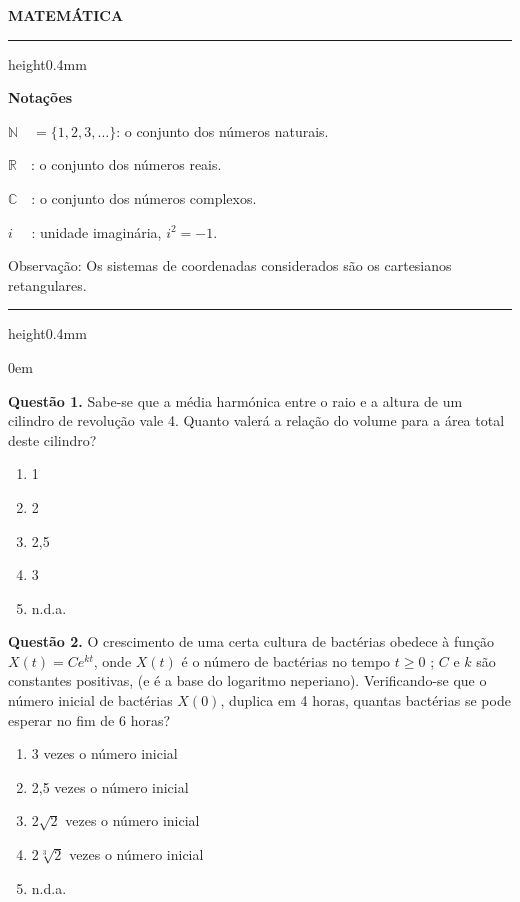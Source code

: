 \documentclass[11pt]{article}
\newcommand*\varhrulefill[1][0.4pt]{\leavevmode\leaders\hrule height#1\hfill\kern0pt}
\begin{document}
\begin{center}
    \textbf{MATEMÁTICA}
\end{center}

\noindent\varhrulefill[0.4mm]

\vspace{6pt}

\noindent \textbf{Notações}

\vspace{6pt}

$\mathbb{N}\quad = \{ 1,2,3, \dots \}$: o conjunto dos números naturais.

$\mathbb{R}\quad$: o conjunto dos números reais.

$\mathbb{C}\quad$: o conjunto dos números complexos.

$i \, \, \quad$: unidade imaginária, $i^2 = -1$.

\vspace{6pt}

\noindent Observação: Os sistemas de coordenadas considerados são os cartesianos retangulares.

\noindent\varhrulefill[0.4mm]

\vspace{6pt}

\parindent0em

\textbf{Questão 1.} Sabe-se que a média harmónica entre o raio e a altura de  um  cilindro  de  revolução  vale  4.  Quanto  valerá  a  relação do volume para a área total deste cilindro? 

\begin{multicols}{5}
    \begin{enumerate}[\bf A (\quad)]
        \item 1 
        \item 2
        \item 2,5
        \item 3
        \item n.d.a.
    \end{enumerate}
\end{multicols}

\textbf{Questão 2.} O  crescimento  de  uma  certa  cultura  de  bactérias  obedece  à  função  $X(t)  =  Ce^{kt}$,  onde  $X(t)$  é  o  número  de  bactérias no tempo $t \geq 0$ ; $C$ e $k$ são constantes positivas, (e é a base do logaritmo neperiano). Verificando-se que o número  inicial  de  bactérias  $X(0)$,  duplica  em  4  horas,  quantas bactérias se pode esperar no fim de 6 horas?

\begin{enumerate}[\bf A (\quad)]
    \item 3 vezes o número inicial
    \item 2,5 vezes o número inicial
    \item $2\sqrt{2}$ vezes o número inicial
    \item $2\sqrt[3]{2}$ vezes o número inicial
    \item n.d.a.
\end{enumerate}
\end{document}

